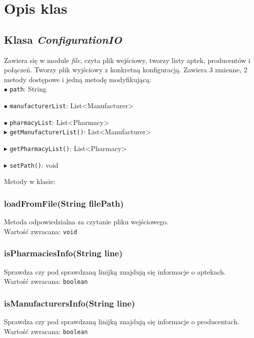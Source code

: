 \documentclass[]{article}
\begin{document}
    \section{Opis klas }

    \subsection{Klasa \textit{ConfigurationIO}}
    Zawiera się w module \textit{file}, czyta plik wejściowy, tworzy listy aptek, producentów i połączeń. Tworzy plik wyjściowy z konkretną konfiguracją. Zawiera 3 zmienne, 2 metody dostępowe i jedną metodę modyfikującą:\\

    $\bullet$ \verb|path|: String

    $\bullet$ \verb|manufacturerList|: List<Manufacturer>

    $\bullet$ \verb|pharmacyList|: List<Pharmacy>\\

    $ \blacktriangleright $ \verb|getManufacturerList()|: List<Manufacturer>

    $ \blacktriangleright $ \verb|getPharmacyList()|: List<Pharmacy>

    $ \blacktriangleright $ \verb|setPath()|: void

    Metody w klasie:

    \subsubsection{loadFromFile(String filePath)}
    Metoda odpowiedzialna za czytanie pliku wejściowego.\\
    Wartość zwracana: \verb|void|

    \subsubsection{isPharmaciesInfo(String line)}
    Sprawdza czy pod sprawdzaną linijką znajdują się informacje o aptekach.\\
    Wartość zwracana: \verb|boolean|

    \subsubsection{isManufacturersInfo(String line)}
    Sprawdza czy pod sprawdzaną linijką znajdują się informacje o producentach.\\
    Wartość zwracana: \verb|boolean|
\end{document}
